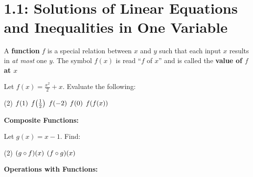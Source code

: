 \documentclass[../mathNotesPreamble]{subfiles}
\begin{document}
  \section{1.1: Solutions of Linear Equations and Inequalities in One Variable}
  \begin{defn*}
    A \textbf{function} $f$ is a special relation between $x$ and $y$ such that each input $x$ results in \emph{at most} one $y$. The symbol $f(x)$ is read ``$f$ of $x$'' and is called the \textbf{value of $f$ at $x$}
  \end{defn*}
  \vspace*{0\baselineskip}
  \begin{ex*}
    Let $f(x)=\frac{x^2}{2}+x$. Evaluate the following:
    \begin{extasks}[after-item-skip=\stretch{1}](2)
      \task $f{\left(1\right)}$
      \task $f{\left(\frac{1}{2}\right)}$
      \task $f{\left(-2\right)}$
      \task $f{\left(0\right)}$
      \task $f{\left(f(x)\right)}$
    \end{extasks}
  \end{ex*}

  \noindent\textbf{Composite Functions:}

  \noindent{}
  \begin{ex*}
    Let $g(x)=x-1$. Find:
    \begin{extasks}[after-item-skip=\stretch{1}](2)
      \task ${\left(g\circ f\right)}(x)$
      \task ${\left(f\circ g\right)}(x)$
    \end{extasks}
  \end{ex*}

  \pagebreak
  \noindent\textbf{Operations with Functions:}

  \noindent{}
\end{document}
